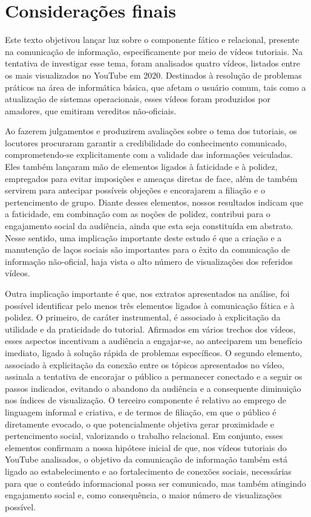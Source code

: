 \documentclass[portuguese]{textolivre}
\begin{document}
\section{Considerações finais}\label{sec-titulo}
Este texto objetivou lançar luz sobre o componente fático e relacional, presente na comunicação de informação, especificamente por meio de vídeos tutoriais. Na tentativa de investigar esse tema, foram analisados quatro vídeos, listados entre os mais visualizados no YouTube em 2020. Destinados à resolução de problemas práticos na área de informática básica, que afetam o usuário comum, tais como a atualização de sistemas operacionais, esses vídeos foram produzidos por amadores, que emitiram vereditos não-oficiais. 

Ao fazerem julgamentos e produzirem avaliações sobre o tema dos tutoriais, os locutores procuraram garantir a credibilidade do conhecimento comunicado, comprometendo-se explicitamente com a validade das informações veiculadas. Eles também lançaram mão de elementos ligados à faticidade e à polidez, empregados para evitar imposições e ameaças diretas de face, além de também servirem para antecipar possíveis objeções e encorajarem a filiação e o pertencimento de grupo. Diante desses elementos, nossos resultados indicam que a faticidade, em combinação com as noções de polidez, contribui para o engajamento social da audiência, ainda que esta seja constituída em abstrato. Nesse sentido, uma implicação importante deste estudo é que a criação e a manutenção de laços sociais são importantes para o êxito da comunicação de informação não-oficial, haja vista o alto número de visualizações dos referidos vídeos.

Outra implicação importante é que, nos extratos apresentados na análise, foi possível identificar pelo menos três elementos ligados à comunicação fática e à polidez. O primeiro, de caráter instrumental, é associado à explicitação da utilidade e da praticidade do tutorial. Afirmados em vários trechos dos vídeos, esses aspectos incentivam a audiência a engajar-se, ao anteciparem um benefício imediato, ligado à solução rápida de problemas específicos. O segundo elemento, associado à explicitação da conexão entre os tópicos apresentados no vídeo, assinala a tentativa de encorajar o público a permanecer conectado e a seguir os passos indicados, evitando o abandono da audiência e a consequente diminuição nos índices de visualização. O terceiro componente é relativo ao emprego de linguagem informal e criativa, e de termos de filiação, em que o público é diretamente evocado, o que potencialmente objetiva gerar proximidade e pertencimento social, valorizando o trabalho relacional. Em conjunto, esses elementos confirmam a nossa hipótese inicial de que, nos vídeos tutoriais do YouTube analisados, o objetivo da comunicação de informação também está ligado ao estabelecimento e ao fortalecimento de conexões sociais, necessárias para que o conteúdo informacional possa ser comunicado, mas também atingindo engajamento social e, como consequência, o maior número de visualizações possível. 
\end{document}
